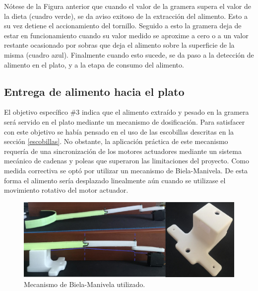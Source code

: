 Nótese de la Figura anterior que cuando el valor de la gramera supera el valor de la dieta (cuadro verde), se da aviso exitoso de la extracción del alimento. Esto a su vez detiene el accionamiento del tornillo. Seguido a esto la gramera deja de estar en funcionamiento cuando su valor medido se aproxime a cero o a un valor restante ocasionado por sobras que deja el alimento sobre la superficie de la misma (cuadro azul). Finalmente cuando esto sucede, se da paso a la detección de alimento en el plato, y a la etapa de consumo del alimento.

\subsection{Entrega de alimento hacia el plato}\label{biela}

El objetivo específico \#3 indica que el alimento extraído y pesado en la gramera será servido en el plato mediante un mecanismo de dosificación. Para satisfacer con este objetivo se había pensado en el uso de las escobillas descritas en la sección \ref{escobillas}. No obstante, la aplicación práctica de este mecanismo requería de una sincronización de los motores actuadores mediante un sistema mecánico de cadenas y poleas que superaron las limitaciones del proyecto. Como medida correctiva se optó por utilizar un mecanismo de Biela-Manivela. De esta forma el alimento sería desplazado linealmente aún cuando se utilizase el movimiento rotativo del motor actuador.

\begin{figure}[H]
	\begin{center}
		\includegraphics[scale=0.50]{img/manivela.png}
	\end{center}
	\caption{Mecanismo de Biela-Manivela utilizado.}\label{manivela}
\end{figure}

